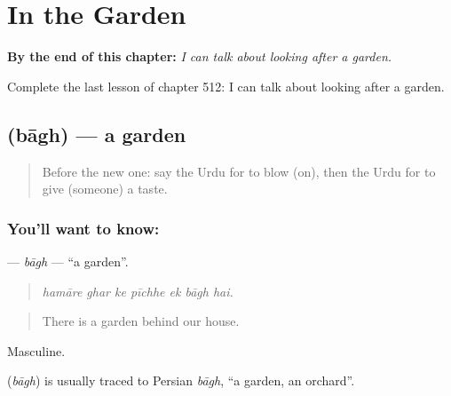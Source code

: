 
\chapter{In the Garden}
\label{ch:ur-in-the-garden}

\begin{chapteropening}
\textbf{By the end of this chapter:} \emph{I can talk about looking after a garden.}

Complete the last lesson of chapter 512: I can talk about looking after a garden.
\end{chapteropening}

\section[\texorpdfstring{\ur{باغ} (bāgh)}{باغ (bāgh)}]{ (bāgh) — a garden}

\label{lesson:UR-C512-bagh}



\begin{quote}
Before the new one: say the Urdu for to blow (on), then the Urdu for to give (someone) a taste.
\end{quote}

\subsection*{You'll want to know: }
\textbf{} — \emph{bāgh} — \textquotedblleft{}a garden\textquotedblright{}.

\begin{quote}
      
\end{quote}

\begin{quote}
\emph{hamāre ghar ke pīchhe ek bāgh hai.}
\end{quote}

\begin{quote}
There is a garden behind our house.
\end{quote}

Masculine.

\begin{cousinweb}
\textbf{} (\emph{bāgh}) is usually traced to Persian \emph{bāgh}, \textquotedblleft{}a garden, an orchard\textquotedblright{}.
\end{cousinweb}

